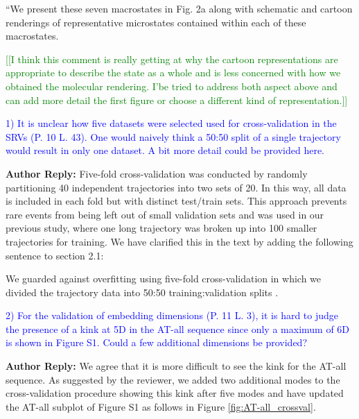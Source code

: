 \documentclass[11pt,a4paper]{letter} %
\newcommand*{\rood}[1]{{\color{red}{#1}}}
\newcommand*{\noteg}[1]{\textcolor{green}{[[#1]]}}		%
\begin{document}
``We present these seven macrostates in Fig. 2a along with schematic and cartoon renderings of representative microstates contained within each of these macrostates. \rood{Molecular renderings were sampled from microstates with the highest probability of being clustered into their respective PCCA+ macrostates and should therefore reflect the macrostate population as whole''}

\noteg{I think this comment is really getting at why the cartoon representations are appropriate to describe the state as a whole and is less concerned with how we obtained the molecular rendering. I'be tried to address both aspect above and can add more detail the first figure or choose a different kind of representation.}

\textcolor{blue}{1)      It is unclear how five datasets were selected used for cross-validation in the SRVs (P. 10 L. 43). One would naively think a 50:50 split of a single trajectory would result in only one dataset. A bit more detail could be provided here.}

\textbf{Author Reply:}   Five-fold cross-validation was conducted by randomly partitioning 40 independent trajectories into two sets of 20. In this way, all data is included in each fold but with distinct test/train sets. This approach prevents rare events from being left out of small validation sets and was used in our previous study, where one long trajectory was broken up into 100 \citep{Sidky2019High-ResolutionVAMPnets} smaller trajectories for training. We have  clarified this in the text by adding the following sentence to section 2.1: 

We guarded against overfitting using five-fold cross-validation in which we divided the trajectory data into 50:50 training:validation splits \rood{such that random combinations of 20 trajectories were partitioned into each set}.\citep{Sidky2019High-ResolutionVAMPnets}

\textcolor{blue}{2)      For the validation of embedding dimensions (P. 11 L. 3), it is hard to judge the presence of a kink at 5D in the AT-all sequence since only a maximum of 6D is shown in Figure S1. Could a few additional dimensions be provided?}

\textbf{Author Reply:}   We agree that it is more difficult to see the kink for the AT-all sequence. As suggested by the reviewer, we added two additional modes to the cross-validation procedure showing this kink after five modes and have updated the AT-all subplot of Figure S1 as follows in Figure \ref{fig:AT-all_crossval}.
\end{document}
